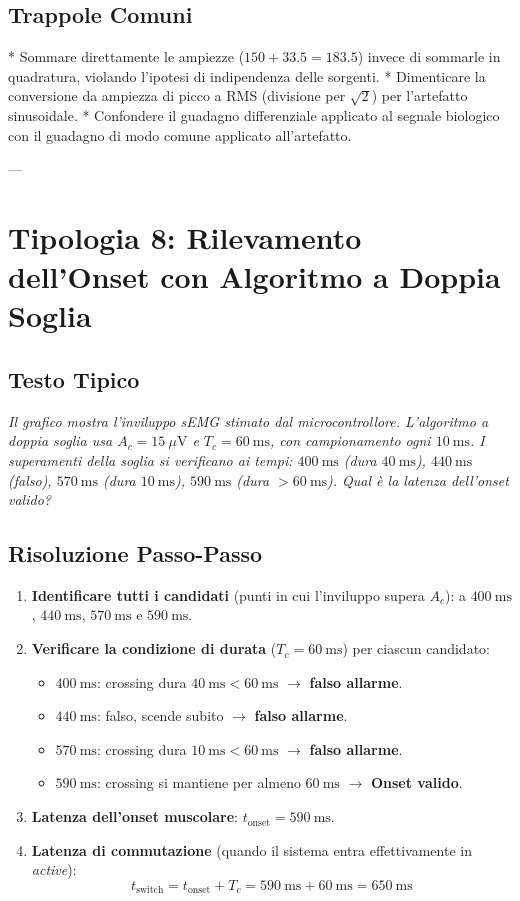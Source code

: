 \documentclass[10pt, letterpaper]{report}
\begin{document}
\subsection*{Trappole Comuni}
* Sommare direttamente le ampiezze ($150 + 33.5 = 183.5$) invece di sommarle in quadratura, violando l'ipotesi di indipendenza delle sorgenti.
* Dimenticare la conversione da ampiezza di picco a RMS (divisione per $\sqrt{2}$) per l'artefatto sinusoidale.
* Confondere il guadagno differenziale applicato al segnale biologico con il guadagno di modo comune applicato all'artefatto.

---

\section{Tipologia 8: Rilevamento dell'Onset con Algoritmo a Doppia Soglia}

\subsection*{Testo Tipico}
\emph{Il grafico mostra l'inviluppo sEMG stimato dal microcontrollore. L'algoritmo a doppia soglia usa $A_c = 15\ \mu\text{V}$ e $T_c = 60\ \text{ms}$, con campionamento ogni $10\ \text{ms}$.
I superamenti della soglia si verificano ai tempi: $400\ \text{ms}$ (dura $40\ \text{ms}$), $440\ \text{ms}$ (falso), $570\ \text{ms}$ (dura $10\ \text{ms}$), $590\ \text{ms}$ (dura $>60\ \text{ms}$).
Qual è la latenza dell'onset valido?}

\subsection*{Risoluzione Passo-Passo}
\begin{enumerate}
    \item \textbf{Identificare tutti i candidati} (punti in cui l'inviluppo supera $A_c$):
    a $400\ \text{ms}$, $440\ \text{ms}$, $570\ \text{ms}$ e $590\ \text{ms}$.
    \item \textbf{Verificare la condizione di durata} ($T_c = 60\ \text{ms}$) per ciascun candidato:
    \begin{itemize}
        \item $400\ \text{ms}$: crossing dura $40\ \text{ms} < 60\ \text{ms}$ $\to$ \textbf{falso allarme}.
        \item $440\ \text{ms}$: falso, scende subito $\to$ \textbf{falso allarme}.
        \item $570\ \text{ms}$: crossing dura $10\ \text{ms} < 60\ \text{ms}$ $\to$ \textbf{falso allarme}.
        \item $590\ \text{ms}$: crossing si mantiene per almeno $60\ \text{ms}$ $\to$ \textbf{Onset valido}.
    \end{itemize}
    \item \textbf{Latenza dell'onset muscolare}: $t_{\text{onset}} = 590\ \text{ms}$.
    \item \textbf{Latenza di commutazione} (quando il sistema entra effettivamente in \emph{active}):
    \[
    t_{\text{switch}} = t_{\text{onset}} + T_c = 590\ \text{ms} + 60\ \text{ms} = 650\ \text{ms}
    \]
\end{enumerate}
\end{document}
